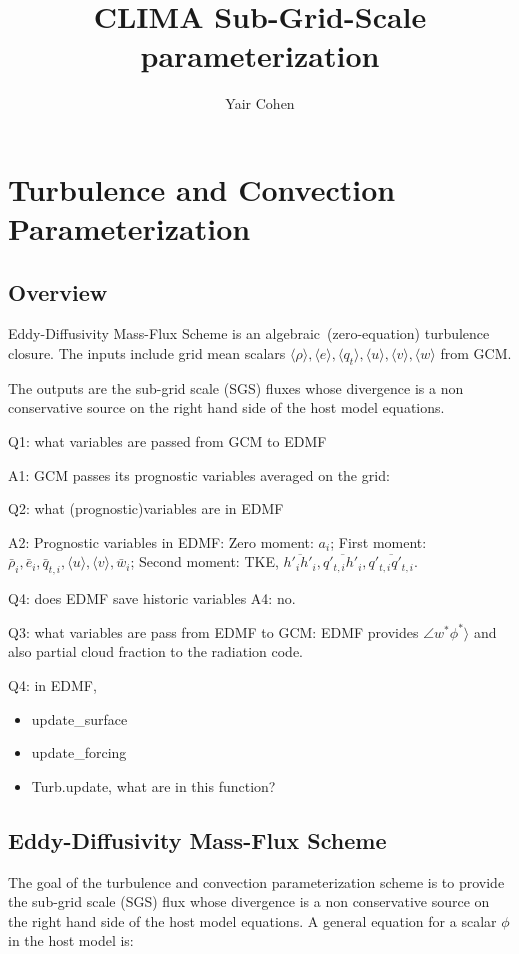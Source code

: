 \documentclass{report}
\title{CLIMA Sub-Grid-Scale parameterization}
\author{Yair Cohen}
\begin{document}
\maketitle
\tableofcontents

\chapter{Turbulence and Convection Parameterization}
\section{Overview}
Eddy-Diffusivity Mass-Flux Scheme is an algebraic~(zero-equation) turbulence closure. The inputs include grid mean scalars
$\langle \rho \rangle, \langle e \rangle, \langle q_t \rangle, \langle u \rangle, \langle v \rangle, \langle w \rangle$ from GCM.

The outputs are the sub-grid scale (SGS) fluxes whose divergence is a non conservative source on the right hand side of the host model equations.

Q1: what variables are passed from GCM to EDMF

A1: GCM passes its prognostic variables averaged on the grid: 

Q2: what (prognostic)variables are in EDMF

A2: Prognostic variables in EDMF:
Zero moment: $a_i$; 
First moment: $\bar{\rho}_i , \bar{e}_i , \bar{q}_{t,i} , \langle u \rangle, \langle v \rangle, \bar{w}_i$; Second moment: TKE, $\overline{h'_i h'_i}, \overline{q'_{t,i} h'_i}, \overline{q'_{t,i} q'_{t,i}}$.

Q4: does EDMF save historic variables
A4: no.

Q3: what variables are pass from EDMF to GCM: EDMF provides $\angle w^* \phi^* \rangle$ and also partial cloud fraction to the radiation code. 

Q4: in EDMF, 
\begin{itemize}
    \item update\_surface
    \item update\_forcing
    \item Turb.update, what are in this function?
\end{itemize}

\section{Eddy-Diffusivity Mass-Flux Scheme}
\label{sec:EDMF-scheme}
The goal of the turbulence and convection parameterization scheme is to provide the sub-grid scale (SGS) flux whose divergence is a non conservative source on the right hand side of the host model equations. A general equation for a scalar $\phi$ in the host model is:
\end{document}
